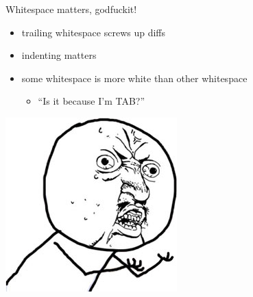 \documentclass{beamer}
\begin{document}
\begin{frame}{Whitespace matters, godfuckit!}
  \pause
  \begin{itemize}
    \item trailing whitespace screws up diffs
    \pause
    \item indenting matters
    \pause
    \item some whitespace is more white than other whitespace
    \pause
    \begin{itemize}
      \item ``Is it because I'm TAB?''
    \end{itemize}
  \end{itemize}
  \pause
  \begin{center}
    \includegraphics[scale=0.5]{img/yuno}
  \end{center}
\end{frame}
\end{document}
